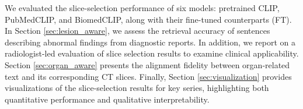 \documentclass[bioengineering,article,submit,pdftex,moreauthors]{Definitions/mdpi}
\begin{document}
We evaluated the slice-selection performance of six models: pretrained CLIP, PubMedCLIP, and BiomedCLIP, along with their fine-tuned counterparts (FT). 
In Section \ref{sec:lesion_aware}, we assess the retrieval accuracy of sentences describing abnormal findings from diagnostic reports. 
In addition, we report on a radiologist-led evaluation of slice selection results to examine clinical applicability.
Section \ref{sec:organ_aware} presents the alignment fidelity between organ-related text and its corresponding CT slices. 
Finally, Section \ref{sec:visualization} provides visualizations of the slice-selection results for key series, highlighting both quantitative performance and qualitative interpretability.
\end{document}
